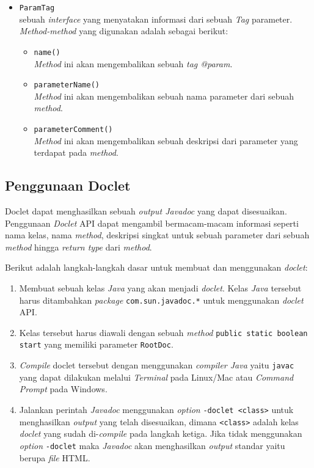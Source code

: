 \begin{itemize}
\begin{itemize}
		{\it Method} ini akan mengembalikan {\it signature} dari sebuah {\it method}. Jika terdapat {\it Method} dengan parameter (String x, int y), maka akan mengembalikan (String, int).
	\end{itemize}
	\item {\tt ParamTag}\\
	sebuah {\it interface} yang menyatakan informasi dari sebuah {\it Tag} parameter. {\it Method-method} yang digunakan adalah sebagai berikut:
	\begin{itemize}
		\item {\tt name()}\\
		{\it Method} ini akan mengembalikan sebuah {\it tag @param}.
		\item {\tt parameterName()}\\
		{\it Method} ini akan mengembalikan sebuah nama parameter dari sebuah {\it method}.
		\item {\tt parameterComment()}\\
		{\it Method} ini akan mengembalikan sebuah deskripsi dari parameter yang terdapat pada {\it method}.
	\end{itemize}
\end{itemize}

\subsection{Penggunaan Doclet}
\label{sec:penggunaan-doclet}
Doclet dapat menghasilkan sebuah {\it output Javadoc} yang dapat disesuaikan. Penggunaan {\it Doclet} API dapat mengambil bermacam-macam informasi seperti nama kelas, nama {\it method}, deskripsi singkat untuk sebuah parameter dari sebuah {\it method} hingga {\it return type} dari {\it method}.

Berikut adalah langkah-langkah dasar untuk membuat dan menggunakan {\it doclet}:
\begin{enumerate}
	\item Membuat sebuah kelas {\it Java} yang akan menjadi {\it doclet}. Kelas {\it Java} tersebut harus ditambahkan {\it package} {\tt com.sun.javadoc.*} untuk menggunakan {\it doclet} API.
	\item Kelas tersebut harus diawali dengan sebuah {\it method} {\tt public static boolean start} yang memiliki parameter {\tt RootDoc}.
	\item {\it Compile} doclet tersebut dengan menggunakan {\it compiler Java} yaitu {\tt javac} yang dapat dilakukan melalui {\it Terminal} pada Linux/Mac atau {\it Command Prompt} pada Windows.
	\item Jalankan perintah {\it Javadoc} menggunakan {\it option} {\tt -doclet <class>} untuk menghasilkan {\it output} yang telah disesuaikan, dimana {\tt <class>} adalah kelas {\it doclet} yang sudah di-{\it compile} pada langkah ketiga. Jika tidak menggunakan {\it option} {\tt -doclet} maka {\it Javadoc} akan menghasilkan {\it output} standar yaitu berupa {\it file} HTML.
\end{enumerate}

